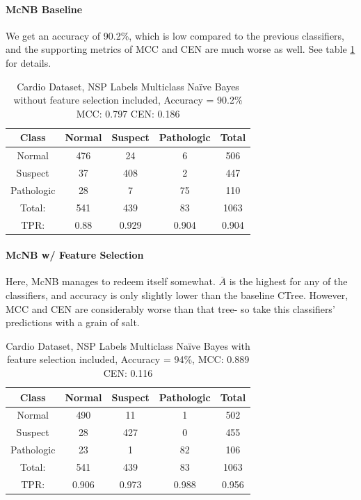 \paragraph{McNB Baseline}
We get an accuracy of 90.2\%, which is low compared to the previous classifiers, and the supporting metrics of MCC and CEN are much worse as well.  See table \ref{tab:cardioNSPmcnbbase} for details.
\begin{table}[h]
	\centering
	\begin{tabular}{|c|c|c|c|c|}
		\hline
Class&Normal&Suspect&Pathologic&Total\\\hline
Normal&476&24&6&506\\
Suspect&37&408&2&447\\
Pathologic&28&7&75&110\\\hline
Total:&541&439&83&1063\\
TPR:&0.88&0.929&0.904&0.904\\
\hline
	\end{tabular}
	\caption[Cardiotocography NSP: Multiclass Na\"ive Bayes without Feature Selection Confusion Matrix]{Cardio Dataset, NSP Labels Multiclass Na\"ive Bayes without feature selection included, Accuracy = 90.2\% MCC: 0.797 CEN: 0.186}
\label{tab:cardioNSPmcnbbase}
\end{table}
\paragraph{McNB w/ Feature Selection}
Here, McNB manages to redeem itself somewhat.  $\overline{A}$ is the highest for any of the classifiers, and accuracy is only slightly lower than the baseline CTree.  However, MCC and CEN are considerably worse than that tree- so take this classifiers' predictions with a grain of salt.  
\begin{table}[h]
	\centering
	\begin{tabular}{|c|c|c|c|c|}
		\hline
Class&Normal&Suspect&Pathologic&Total\\\hline
Normal&490&11&1&502\\
Suspect&28&427&0&455\\
Pathologic&23&1&82&106\\\hline
Total:&541&439&83&1063\\
TPR:&0.906&0.973&0.988&0.956\\
\hline
	\end{tabular}
	\caption[Cardiotocography NSP: Multiclass Na\"ive Bayes with Feature Selection Confusion Matrix]{Cardio Dataset, NSP Labels Multiclass Na\"ive Bayes with feature selection included, Accuracy = 94\%, MCC: 0.889 CEN: 0.116}
	\label{tab:cardioNSPmcnb}
\end{table}

